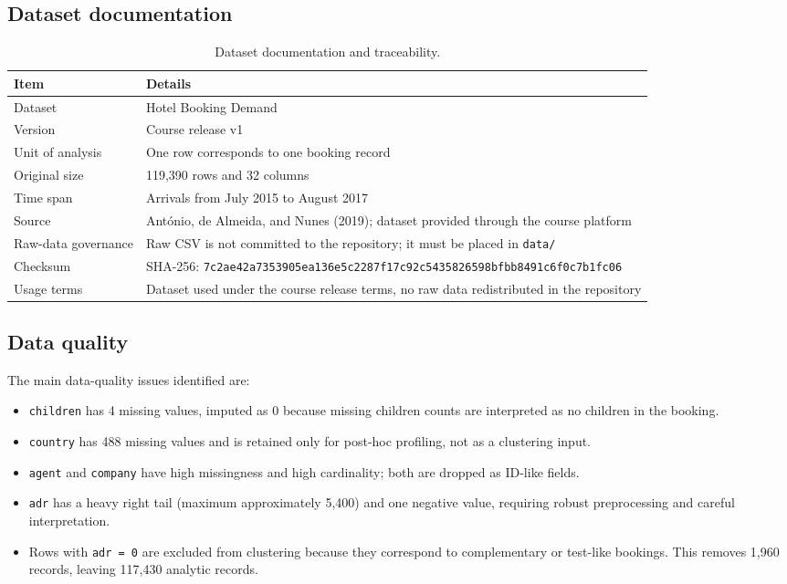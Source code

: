 \documentclass[11pt,a4paper]{article}
\newcommand{\dataset}{Hotel Booking Demand}
\begin{document}
\subsection{Dataset documentation}
\begin{table}[H]
\centering
\caption{Dataset documentation and traceability.}
\begin{tabularx}{\textwidth}{lX}
\toprule
\textbf{Item} & \textbf{Details} \\
\midrule
Dataset & \dataset{} \\
Version & Course release v1 \\
Unit of analysis & One row corresponds to one booking record \\
Original size & 119,390 rows and 32 columns \\
Time span & Arrivals from July 2015 to August 2017 \\
Source & António, de Almeida, and Nunes (2019); dataset provided through the course platform \\
Raw-data governance & Raw CSV is not committed to the repository; it must be placed in \texttt{data/}  \\
Checksum & SHA-256: \texttt{7c2ae42a7353905ea136e5c2287f17\allowbreak c92c5435826598bf\allowbreak bb8491c6f0c7b1fc06} \\
Usage terms & Dataset used under the course release terms, no raw data redistributed in the repository \\
\bottomrule
\end{tabularx}
\end{table}

\subsection{Data quality}
The main data-quality issues identified are:
\begin{itemize}
    \item \texttt{children} has 4 missing values, imputed as 0 because missing children counts are interpreted as no children in the booking.
    \item \texttt{country} has 488 missing values and is retained only for post-hoc profiling, not as a clustering input.
    \item \texttt{agent} and \texttt{company} have high missingness and high cardinality; both are dropped as ID-like fields.
    \item \texttt{adr} has a heavy right tail (maximum approximately \texteuro{}5,400) and one negative value, requiring robust preprocessing and careful interpretation.
    \item Rows with \texttt{adr = 0} are excluded from clustering because they correspond to complementary or test-like bookings. This removes 1,960 records, leaving 117,430 analytic records.
\end{itemize}
\end{document}
